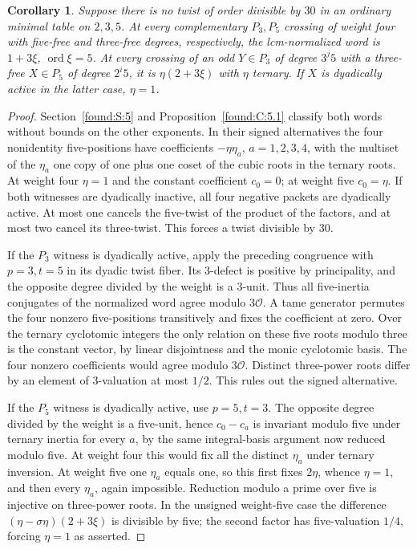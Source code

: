 \documentclass[11pt,a4paper]{article}
\numberwithin{equation}{section}
\newtheorem{corollary}[theorem]{Corollary}
\theoremstyle{remark}
\begin{document}
\begin{corollary}\label{found:J:5.2}\label{found:J:key:pr:unsignedall}
Suppose there is no twist of order divisible by $30$ in an ordinary
minimal table on $2,3,5$. At every complementary $P_3,P_5$ crossing
of weight four with five-free and three-free degrees, respectively,
the lcm-normalized word is $1+3\xi$, $\operatorname{ord}\xi=5$.
At every crossing of an odd $Y\in P_3$ of degree $3^j5$ with
a three-free $X\in P_5$ of degree $2^i5$, it is
$\eta(2+3\xi)$ with $\eta$ ternary. If $X$ is dyadically active
in the latter case, $\eta=1$.
\end{corollary}
\begin{proof}
Section~\ref{found:S:5} and Proposition~\ref{found:C:5.1} classify both words without bounds on the other exponents. In their signed alternatives the four
nonidentity five-positions have coefficients $-\eta\eta_a$,
$a=1,2,3,4$, with the multiset of the $\eta_a$ one copy of one
plus one coset of the cubic roots in the ternary roots. At weight
four $\eta=1$ and the constant coefficient $c_0=0$; at weight five
$c_0=\eta$. If both witnesses are dyadically inactive, all four
negative packets are dyadically active. At most one cancels the
five-twist of the product of the factors, and at most two cancel its
three-twist. This forces a twist divisible by $30$.

If the $P_3$ witness is dyadically active, apply the preceding
congruence with $p=3,t=5$ in its dyadic twist fiber. Its $3$-defect
is positive by principality, and the opposite degree divided by the
weight is a $3$-unit. Thus all five-inertia conjugates of the
normalized word agree modulo $3\mathcal O$. A tame generator permutes
the four nonzero five-positions transitively and fixes the coefficient
at zero. Over the ternary cyclotomic integers the only relation on
these five roots modulo three is the constant vector, by linear
disjointness and the monic cyclotomic basis. The four nonzero
coefficients would agree modulo $3\mathcal O$. Distinct three-power
roots differ by an element of $3$-valuation at most $1/2$.
This rules out the signed alternative.

If the $P_5$ witness is dyadically active, use $p=5,t=3$.
The opposite degree divided by the weight is a five-unit, hence
$c_0-c_a$ is invariant modulo five under ternary inertia for every
$a$, by the same integral-basis argument now reduced modulo five.
At weight four this would fix all the distinct $\eta_a$ under ternary
inversion. At weight five one $\eta_a$ equals one, so this first
fixes $2\eta$, whence $\eta=1$, and then every $\eta_a$, again
impossible. Reduction modulo a prime over five is injective on
three-power roots. In the unsigned weight-five case the difference
$ (\eta-\sigma\eta)(2+3\xi)$ is divisible by five; the second
factor has five-valuation $1/4$, forcing $\eta=1$ as asserted.
\end{proof}
\end{document}
